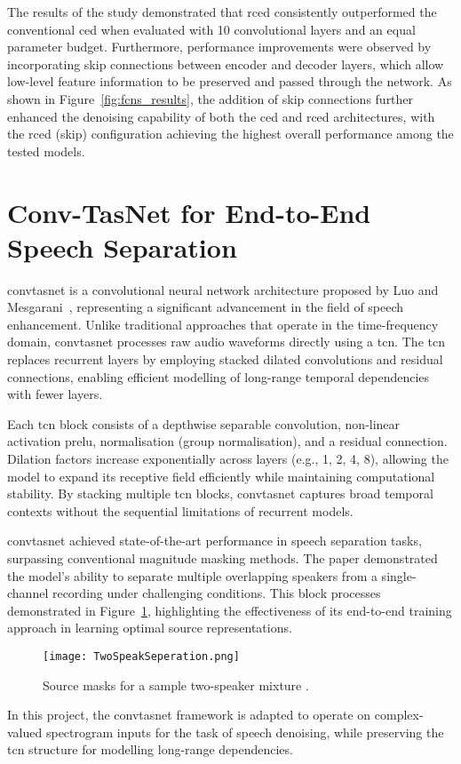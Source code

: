 The results of the study demonstrated that \gls{rced} consistently outperformed the conventional \gls{ced} when evaluated with 10 convolutional layers and an equal parameter budget. Furthermore, performance improvements were observed by incorporating skip connections between encoder and decoder layers, which allow low-level feature information to be preserved and passed through the network. As shown in Figure~\ref{fig:fcns_results}, the addition of skip connections further enhanced the denoising capability of both the \gls{ced} and \gls{rced} architectures, with the \gls{rced} (skip) configuration achieving the highest overall performance among the tested models.


\section{Conv-TasNet for End-to-End Speech Separation}
\label{sec:convtasnet_lit_review}

\gls{convtasnet} is a convolutional neural network architecture proposed by Luo and Mesgarani~\cite{Luo2018ConvTasNetSI}, representing a significant advancement in the field of speech enhancement. Unlike traditional approaches that operate in the time-frequency domain, \gls{convtasnet} processes raw audio waveforms directly using a \gls{tcn}. The \gls{tcn} replaces recurrent layers by employing stacked dilated convolutions and residual connections, enabling efficient modelling of long-range temporal dependencies with fewer layers.

Each \gls{tcn} block consists of a depthwise separable convolution, non-linear activation \gls{prelu}, normalisation (group normalisation), and a residual connection. Dilation factors increase exponentially across layers (e.g., 1, 2, 4, 8), allowing the model to expand its receptive field efficiently while maintaining computational stability. By stacking multiple \gls{tcn} blocks, \gls{convtasnet} captures broad temporal contexts without the sequential limitations of recurrent models.

\gls{convtasnet} achieved state-of-the-art performance in speech separation tasks, surpassing conventional magnitude masking methods. The paper demonstrated the model's ability to separate multiple overlapping speakers from a single-channel recording under challenging conditions. This block processes demonstrated in Figure~\ref{fig:convtasnet}, highlighting the effectiveness of its end-to-end training approach in learning optimal source representations.

\begin{figure}[H]
    \centering
    \texttt{[image: TwoSpeakSeperation.png]}
    \caption{Source masks for a sample two-speaker mixture \cite{Luo2018ConvTasNetSI}.}
    \label{fig:convtasnet}
\end{figure}

In this project, the \gls{convtasnet} framework is adapted to operate on complex-valued spectrogram inputs for the task of speech denoising, while preserving the \gls{tcn} structure for modelling long-range dependencies.
